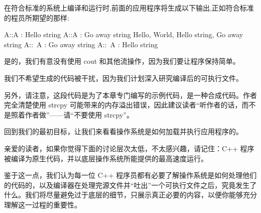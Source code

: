 在符合标准的系统上编译和运行时,前面的应用程序将生成以下输出,正如符合标准的程员所期望的那样:

\begin{shell}
A::A : Hello string
A::A : Go away string
Hello, World, Hello string, Go away string
A::~A : Go away string
A::~A : Hello string
\end{shell}

是的，我们有意没有使用 cout 和其他流操作，因为我们要让程序保持简单。

我们不希望生成的代码被干扰，因为我们计划深入研究编译后的可执行文件。

另外，请注意，这段代码是为了本章专门编写的示例代码，是一种合成代码。作者完全清楚使用 strcpy 可能带来的内存溢出错误，因此建议读者“听作者的话，而不是照着作者做”——请“不要使用 strcpy”。

回到我们的最初目标，让我们来看看操作系统是如何加载并执行应用程序的。

亲爱的读者，如果你觉得下面的讨论层次太低，不太感兴趣，请记住：C++ 程序被编译为原生代码，并以底层操作系统所能提供的最高速度运行。

鉴于这一点，我们认为每一位 C++ 程序员都有必要了解操作系统是如何处理他们的代码的，以及编译器在处理完源文件并“吐出”一个可执行文件之后，究竟发生了什么。我们将尽量避免过于底层的细节，只展示真正必要的内容，以便你能够充分理解这一过程的重要性。











































